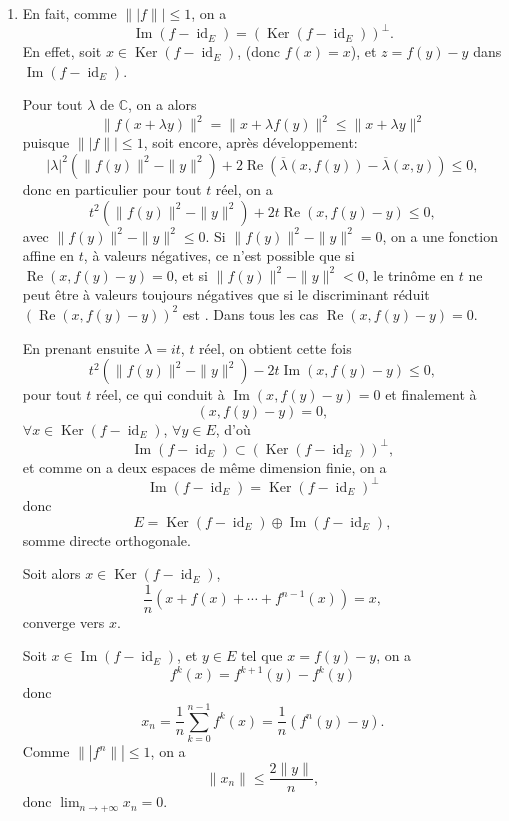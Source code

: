 \begin{enumerate}[label=\arabic*.,leftmargin=2.2em,itemsep=1.15em]
Finalement
\[
\inf\{\|\!|A-M\|\!|;\ \det M=0\}=\sqrt{\lambda_n},
\]
et cet inf est atteint.

\item En fait, comme $\|\!|f\|\!|\le1$, on a
\[
\operatorname{Im}(f-\operatorname{id}_E)=(\operatorname{Ker}(f-\operatorname{id}_E))^\perp.
\]
En effet, soit $x\in\operatorname{Ker}(f-\operatorname{id}_E)$, (donc $f(x)=x$), et $z=f(y)-y$ dans $\operatorname{Im}(f-\operatorname{id}_E)$.

Pour tout $\lambda$ de $\mathbb C$, on a alors
\[
\|f(x+\lambda y)\|^2=\|x+\lambda f(y)\|^2\le\|x+\lambda y\|^2
\]
puisque $\|\!|f\|\!|\le1$, soit encore, après développement:
\[
|\lambda|^2(\|f(y)\|^2-\|y\|^2)
+2\operatorname{Re}(\overline\lambda(x,f(y))-\overline\lambda(x,y))\le0,
\]
donc en particulier pour tout $t$ réel, on a
\[
t^2(\|f(y)\|^2-\|y\|^2)+2t\operatorname{Re}(x,f(y)-y)\le0,
\]
avec $\|f(y)\|^2-\|y\|^2\le0$. Si $\|f(y)\|^2-\|y\|^2=0$, on a une fonction affine en $t$, à valeurs négatives, ce n'est possible que si $\operatorname{Re}(x,f(y)-y)=0$, et si $\|f(y)\|^2-\|y\|^2<0$, le trinôme en $t$ ne peut être à valeurs toujours négatives que si le discriminant réduit $(\operatorname{Re}(x,f(y)-y))^2$ est . Dans tous les cas $\operatorname{Re}(x,f(y)-y)=0$.

En prenant ensuite $\lambda=it$, $t$ réel, on obtient cette fois
\[
t^2(\|f(y)\|^2-\|y\|^2)-2t\operatorname{Im}(x,f(y)-y)\le0,
\]
pour tout $t$ réel, ce qui conduit à $\operatorname{Im}(x,f(y)-y)=0$ et finalement à
\[
(x,f(y)-y)=0,
\]
$\forall x\in\operatorname{Ker}(f-\operatorname{id}_E)$, $\forall y\in E$, d'où
\[
\operatorname{Im}(f-\operatorname{id}_E)\subset(\operatorname{Ker}(f-\operatorname{id}_E))^\perp,
\]
et comme on a deux espaces de même dimension finie, on a
\[
\operatorname{Im}(f-\operatorname{id}_E)=\operatorname{Ker}(f-\operatorname{id}_E)^\perp
\]
donc
\[
E=\operatorname{Ker}(f-\operatorname{id}_E)\oplus\operatorname{Im}(f-\operatorname{id}_E),
\]
somme directe orthogonale.

Soit alors $x\in\operatorname{Ker}(f-\operatorname{id}_E)$,
\[
\frac1n(x+f(x)+\cdots+f^{n-1}(x))=x,
\]
converge vers $x$.

Soit $x\in\operatorname{Im}(f-\operatorname{id}_E)$, et $y\in E$ tel que $x=f(y)-y$, on a
\[
f^k(x)=f^{k+1}(y)-f^k(y)
\]
donc
\[
x_n=\frac1n\sum_{k=0}^{n-1}f^k(x)
=\frac1n(f^n(y)-y).
\]
Comme $\|\!|f^n\|\!|\le1$, on a
\[
\|x_n\|\le\frac{2\|y\|}{n},
\]
donc $\lim_{n\to+\infty}x_n=0$.


\end{enumerate}
